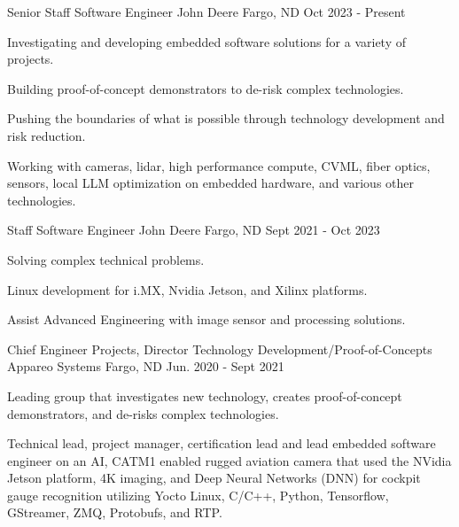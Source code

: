 

\begin{cventries}

\cventry
  {Senior Staff Software Engineer} %
  {John Deere} %
  {Fargo, ND} %
  {Oct 2023 - Present} %
  {
    \begin{cvitems} %
      \item {Investigating and developing embedded software solutions for a variety of projects.}
      \item {Building proof-of-concept demonstrators to de-risk complex technologies.}
      \item {Pushing the boundaries of what is possible through technology development and risk reduction.}
      \item {Working with cameras, lidar, high performance compute, CVML, fiber optics, sensors, local LLM optimization on embedded hardware, and various other technologies.}
    \end{cvitems}
  }

\cventry
  {Staff Software Engineer} %
  {John Deere} %
  {Fargo, ND} %
  {Sept 2021 - Oct 2023} %
  {
    \begin{cvitems} %
      \item {Solving complex technical problems.}
      \item {Linux development for i.MX, Nvidia Jetson, and Xilinx platforms.}
      \item {Assist Advanced Engineering with image sensor and processing solutions.}
    \end{cvitems}
  }

  \cventry
    {Chief Engineer Projects, Director Technology Development/Proof-of-Concepts} %
    {Appareo Systems} %
    {Fargo, ND} %
    {Jun. 2020 - Sept 2021} %
    {
      \begin{cvitems} %
        \item {Leading group that investigates new technology, creates proof-of-concept demonstrators, and de-risks complex technologies.}
        \item {Technical lead, project manager, certification lead and lead embedded software engineer on an AI, CATM1 enabled rugged aviation camera that used the NVidia Jetson platform, 4K imaging, and Deep Neural Networks (DNN) for cockpit gauge recognition utilizing Yocto Linux, C/C++, Python, Tensorflow, GStreamer, ZMQ, Protobufs, and RTP.}
      \end{cvitems}
    }



\end{cventries}
